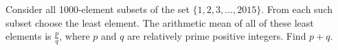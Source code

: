 Consider all 1000-element subsets of the set $\{1,2,3,\dots,2015\}$. From each such subset choose the least element. The arithmetic mean of all of these least elements is $\tfrac{p}{q}$,  where $p$ and $q$ are relatively prime positive integers. Find $p+q$.